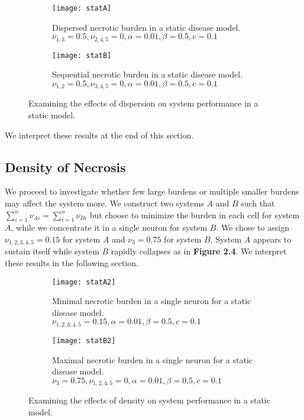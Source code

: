 \documentclass[11pt]{report}
\begin{document}
\begin{figure}
    \centering
    \begin{subfigure}[b]{0.48\textwidth}
        \texttt{[image: statA]}
        \caption{Dispersed necrotic burden in a static disease model. $\nu_{1,3} = 0.5, \nu_{2,4,5} = 0, \alpha = 0.01, \beta = 0.5,c = 0.1$}
        \label{fig:statA}
    \end{subfigure}
    \hfill %
    \begin{subfigure}[b]{0.48\textwidth}
        \texttt{[image: statB]}
        \caption{Sequential necrotic burden in a static disease model. $\nu_{1,2} = 0.5, \nu_{3,4,5} = 0, \alpha = 0.01, \beta = 0.5,c = 0.1$}
        \label{fig:statB}
    \end{subfigure}
    \caption{Examining the effects of dispersion on system performance in a static model. }\label{fig:dispersion}
\end{figure}


We interpret these results at the end of this section. 

\subsection{Density of Necrosis} %
\label{sub:density_of_necrosis}



We proceed to investigate whether few large burdens or multiple smaller burdens may affect the system more. We construct two systems $A$ and $B$ such that $\sum^n_{i=1} \nu_{Ai} = \sum^n_{i=1} \nu_{Bi}$ but choose to minimize the burden in each cell for system $A$, while we concentrate it in a single neuron for system $B$. We chose to assign $\nu_{1,2,3,4,5}= 0.15$ for system $A$ and $\nu_3 = 0.75$ for system $B$. System $A$ appears to sustain itself while system $B$ rapidly collapses as in \textbf{Figure 2.4}. We interpret these results in the following section.

\begin{figure}
    \centering
    \begin{subfigure}[b]{0.48\textwidth}
        \texttt{[image: statA2]}
        \caption{Minimal necrotic burden in a single neuron for a static disease model. $\nu_{1,2,3,4,5} = 0.15, \alpha = 0.01, \beta = 0.5,c = 0.1$}
        \label{fig:statA2}
    \end{subfigure}
    \hfill %
    \begin{subfigure}[b]{0.48\textwidth}
        \texttt{[image: statB2]}
        \caption{Maximal necrotic burden in a single neuron for a static disease model. $\nu_{3} = 0.75, \nu_{1,2,4,5} = 0, \alpha = 0.01, \beta = 0.5,c = 0.1$}
        \label{fig:statB2}
    \end{subfigure}
    \caption{Examining the effects of density on system performance in a static model.}\label{fig:density}
\end{figure}
\end{document}

